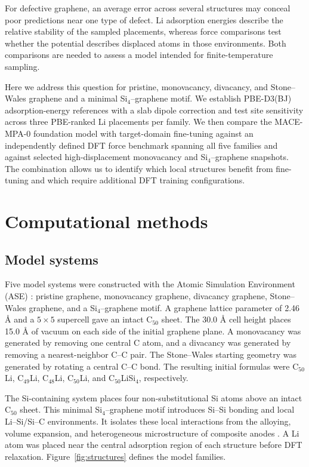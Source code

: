 \documentclass[12pt]{article}
\begin{document}
For defective graphene, an average error across several structures may conceal
poor predictions near one type of defect. Li adsorption energies describe the
relative stability of the sampled placements, whereas force comparisons test
whether the potential describes displaced atoms in those environments. Both
comparisons are needed to assess a model intended for finite-temperature sampling.

Here we address this question for pristine, monovacancy, divacancy, and
Stone--Wales graphene and a minimal Si$_4$--graphene motif. We establish
PBE-D3(BJ) adsorption-energy references with a slab dipole correction and test site
sensitivity across three PBE-ranked Li placements per family. We then compare
the MACE-MPA-0 foundation model with target-domain fine-tuning against an
independently defined DFT force benchmark spanning all five families and
against selected high-displacement monovacancy and Si$_4$--graphene snapshots.
The combination allows us to identify which local structures benefit from
fine-tuning and which require additional DFT training configurations.

\section{Computational methods}

\subsection{Model systems}

Five model systems were constructed with the Atomic Simulation Environment (ASE) \citep{larsen2017ase}: pristine graphene, monovacancy graphene, divacancy graphene, Stone--Wales graphene, and a Si$_4$--graphene motif. A graphene lattice parameter of 2.46 \AA{} and a $5\times5$ supercell gave an intact C$_{50}$ sheet. The 30.0 \AA{} cell height places 15.0 \AA{} of vacuum on each side of the initial graphene plane. A monovacancy was generated by removing one central C atom, and a divacancy was generated by removing a nearest-neighbor C--C pair. The Stone--Wales starting geometry was generated by rotating a central C--C bond. The resulting initial formulas were C$_{50}$Li, C$_{49}$Li, C$_{48}$Li, C$_{50}$Li, and C$_{50}$LiSi$_4$, respectively.

The Si-containing system places four non-substitutional Si atoms above an intact C$_{50}$ sheet. This minimal Si$_4$--graphene motif introduces Si--Si bonding and local Li--Si/Si--C environments. It isolates these local interactions from the alloying, volume expansion, and heterogeneous microstructure of composite anodes \citep{obrovac2014alloy,sehrawat2021silicongraphene}. A Li atom was placed near the central adsorption region of each structure before DFT relaxation. Figure~\ref{fig:structures} defines the model families.
\end{document}

